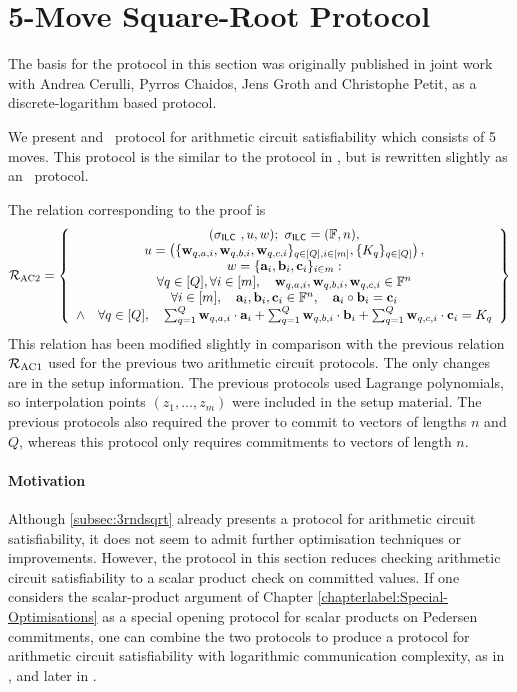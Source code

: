 \section{5-Move Square-Root Protocol} \label{subsec:5rndsqrt}

The basis for the protocol in this section was originally published in joint work \cite{BootleCCGP16} with Andrea Cerulli, Pyrros Chaidos, Jens Groth and Christophe Petit, as a discrete-logarithm based protocol.

We present and \ILC\ protocol for arithmetic circuit satisfiability which consists of 5 moves. This protocol is the similar to the protocol in \cite{BootleG18}, but is rewritten slightly as an \ILC\ protocol.

The relation corresponding to the proof is
\[
\mathcal{R}_{\textnormal{AC2}}=\left\{\begin{array}{c}
(\mathsf{\sigma}_{\mathsf{ILC}~},u,w); \ \mathsf{\sigma}_{\mathsf{ILC}} = (\mathbb{F},n), \\
u = \left( \{\mathbf{w}_{q,{a,i}},\mathbf{w}_{q,{b,i}},\mathbf{w}_{q,{c,i}}\}_{q \in [Q], i \in [m]}, \{K_{q}\}_{q \in [Q]}\right), \\
w = \{\mathbf{a}_i,\mathbf{b}_i,\mathbf{c}_i\}_{i \in m}:\\
\forall q \in [Q], \forall i \in [m], \quad \mathbf{w}_{q,a,i}, \mathbf{w}_{q,b,i}, \mathbf{w}_{q,c,i} \in \mathbb{F}^n \\
\forall i \in [m], \quad \mathbf{a}_i,\mathbf{b}_i,\mathbf{c}_i \in \mathbb{F}^n, \quad \mathbf{a}_i \circ \mathbf{b}_i=\mathbf{c}_i \\
\wedge \quad \forall q \in [Q], \quad \sum_{q=1}^Q \mathbf{w}_{q,a,i} \cdot \mathbf{a}_i + \sum_{q=1}^Q \mathbf{w}_{q,b,i} \cdot \mathbf{b}_i + \sum_{q=1}^Q \mathbf{w}_{q,c,i} \cdot \mathbf{c}_i = K_q
\end{array}\right\}
\]
This relation has been modified slightly in comparison with the previous relation $\mathcal{R}_\text{AC1}$ used for the previous two arithmetic circuit protocols. The only changes are in the setup information. The previous protocols used Lagrange polynomials, so interpolation points $(z_1,\ldots,z_m)$ were included in the setup material. The previous protocols also required the prover to commit to vectors of lengths $n$ and $Q$, whereas this protocol only requires commitments to vectors of length $n$.

\paragraph{Motivation} Although \ref{subsec:3rndsqrt} already presents a protocol for arithmetic circuit satisfiability, it does not seem to admit further optimisation techniques or improvements. However, the protocol in this section reduces checking arithmetic circuit satisfiability to a scalar product check on committed values. If one considers the scalar-product argument of Chapter \ref{chapterlabel:Special-Optimisations} as a special opening protocol for scalar products on Pedersen commitments, one can combine the two protocols to produce a protocol for arithmetic circuit satisfiability with logarithmic communication complexity, as in \cite{BootleCCGP16}, and later in \cite{BunzBBPWM18}.

